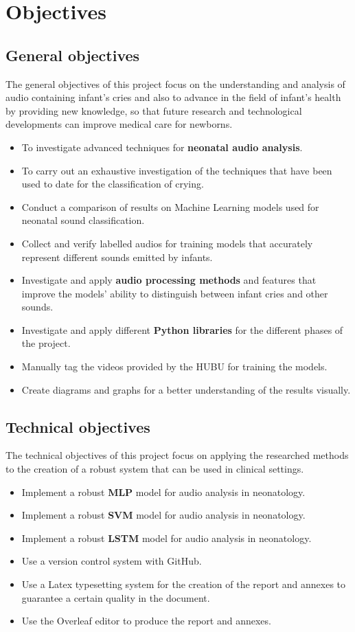 %
\chapter{Objectives}
\label{ch::chapter2}

\section{General objectives}
The general objectives of this project focus on the understanding and analysis of audio containing infant’s cries and also to advance in the field of infant’s health by providing new knowledge, so that future research and technological developments can improve medical care for newborns. 
\begin{itemize}
    \item To investigate advanced techniques for \textbf{neonatal audio analysis}.
    \item To carry out an exhaustive investigation of the techniques that have been used to date for the classification of crying.
    \item Conduct a comparison of results on Machine Learning models used for neonatal sound classification. 
    \item Collect and verify labelled audios for training models that accurately represent different sounds emitted by infants.
    \item Investigate and apply \textbf{audio processing methods} and features that improve the models' ability to distinguish between infant cries and other sounds. 
    \item Investigate and apply different \textbf{Python libraries} for the different phases of the project. 
    \item Manually tag the videos provided by the HUBU for training the models.
    \item Create diagrams and graphs for a better understanding of the results visually.
\end{itemize}

\section{Technical objectives}
The technical objectives of this project focus on applying the researched methods to the creation of a robust system that can be used in clinical settings.
\begin{itemize}
    \item Implement a robust \textbf{MLP} model for audio analysis in neonatology.
    \item Implement a robust \textbf{SVM} model for audio analysis in neonatology.
    \item Implement a robust \textbf{LSTM} model for audio analysis in neonatology.
    \item Use a version control system with GitHub.
    \item Use a Latex typesetting system for the creation of the report and annexes to guarantee a certain quality in the document.
    \item Use the Overleaf editor to produce the report and annexes. 
\end{itemize}

